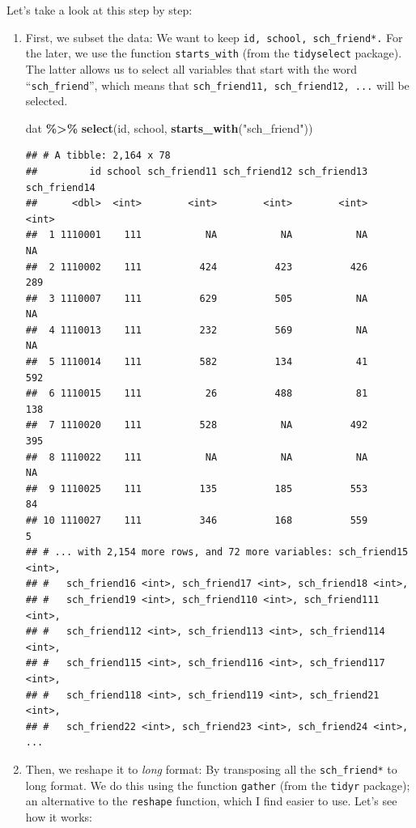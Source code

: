 \documentclass[
]{book}
\newenvironment{Shaded}{\begin{snugshade}}{\end{snugshade}}
\newcommand{\FunctionTok}[1]{\textcolor[rgb]{0.13,0.29,0.53}{\textbf{#1}}}
\newcommand{\NormalTok}[1]{#1}
\newcommand{\SpecialCharTok}[1]{\textcolor[rgb]{0.81,0.36,0.00}{\textbf{#1}}}
\newcommand{\StringTok}[1]{\textcolor[rgb]{0.31,0.60,0.02}{#1}}
\begin{document}
Let's take a look at this step by step:

\begin{enumerate}
\def\labelenumi{\arabic{enumi}.}
\item
  First, we subset the data: We want to keep \texttt{id,\ school,\ sch\_friend*.} For the later, we use the function \texttt{starts\_with} (from the \texttt{tidyselect} package). The latter allows us to select all variables that start with the word ``\texttt{sch\_friend}'', which means that \texttt{sch\_friend11,\ sch\_friend12,\ ...} will be selected.

\begin{Shaded}
\begin{Highlighting}[]
\NormalTok{dat }\SpecialCharTok{\%\textgreater{}\%} 
  \FunctionTok{select}\NormalTok{(id, school, }\FunctionTok{starts\_with}\NormalTok{(}\StringTok{"sch\_friend"}\NormalTok{))}
\end{Highlighting}
\end{Shaded}

\begin{verbatim}
## # A tibble: 2,164 x 78
##         id school sch_friend11 sch_friend12 sch_friend13 sch_friend14
##      <dbl>  <int>        <int>        <int>        <int>        <int>
##  1 1110001    111           NA           NA           NA           NA
##  2 1110002    111          424          423          426          289
##  3 1110007    111          629          505           NA           NA
##  4 1110013    111          232          569           NA           NA
##  5 1110014    111          582          134           41          592
##  6 1110015    111           26          488           81          138
##  7 1110020    111          528           NA          492          395
##  8 1110022    111           NA           NA           NA           NA
##  9 1110025    111          135          185          553           84
## 10 1110027    111          346          168          559            5
## # ... with 2,154 more rows, and 72 more variables: sch_friend15 <int>,
## #   sch_friend16 <int>, sch_friend17 <int>, sch_friend18 <int>,
## #   sch_friend19 <int>, sch_friend110 <int>, sch_friend111 <int>,
## #   sch_friend112 <int>, sch_friend113 <int>, sch_friend114 <int>,
## #   sch_friend115 <int>, sch_friend116 <int>, sch_friend117 <int>,
## #   sch_friend118 <int>, sch_friend119 <int>, sch_friend21 <int>,
## #   sch_friend22 <int>, sch_friend23 <int>, sch_friend24 <int>, ...
\end{verbatim}
\item
  Then, we reshape it to \emph{long} format: By transposing all the \texttt{sch\_friend*} to long format. We do this using the function \texttt{gather} (from the \texttt{tidyr} package); an alternative to the \texttt{reshape} function, which I find easier to use. Let's see how it works:


\end{enumerate}
\end{document}
